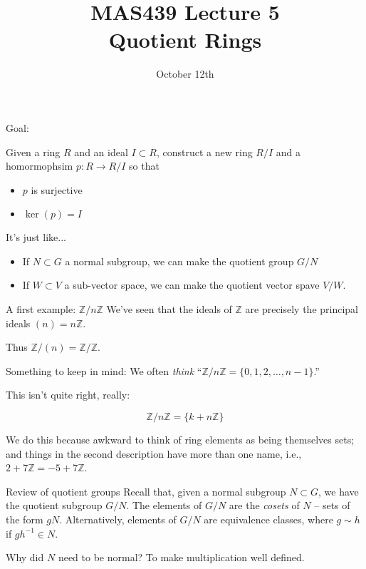 \documentclass{beamer}
\title{MAS439 Lecture 5 \\ Quotient Rings}
\date{October 12th}
\begin{document}
\begin{frame}
\titlepage
\end{frame}

\begin{frame}{Goal:}

  Given a ring $R$ and an ideal $I\subset R$, construct a new ring $R/I$ and a homormophsim $p:R\to R/I$ so that
  \begin{itemize}
  \item $p$ is surjective
  \item $\ker(p)=I$
  \end{itemize}

  \begin{block}{It's just like...}
    \begin{itemize}
    \item If $N\subset G$ a normal subgroup, we can make the quotient group $G/N$
      \item If $W\subset V$ a sub-vector space, we can make the quotient vector spave $V/W$.
    \end{itemize}
\end{block}
  \end{frame}

\begin{frame}{A first example: $\mathbb{Z}/n\mathbb{Z}$}
We've seen that the ideals of $\mathbb{Z}$ are precisely the principal ideals $(n)=n\mathbb{Z}$.

Thus $\mathbb{Z}/(n)=\mathbb{Z}/\mathbb{Z}$.

\begin{block}{Something to keep in mind:}
We often \emph{think} ``$\mathbb{Z}/n\mathbb{Z}=\{0,1,2,\dots, n-1\}$.''

This isn't quite right, really:

$$\mathbb{Z}/n\mathbb{Z}=\{k+n\mathbb{Z} \}$$

We do this because awkward to think of ring elements as being themselves sets; and things in the second description have more than one name, i.e., $2+7\mathbb{Z}=-5+7\mathbb{Z}$.

\end{block}


\end{frame}


\begin{frame}{Review of quotient groups}
Recall that, given a normal subgroup $N \subset  G$, we have the quotient subgroup $G/N$.  The elements of $G/N$ are the \emph{cosets} of $N$ -- sets of the form $gN$.  Alternatively, elements of $G/N$ are equivalence classes, where $g\sim h$ if $gh^{-1}\in N$.

\begin{block}{Why did $N$ need to be normal?}
To make multiplication well defined.

\end{block}

\end{frame}
\end{document}
